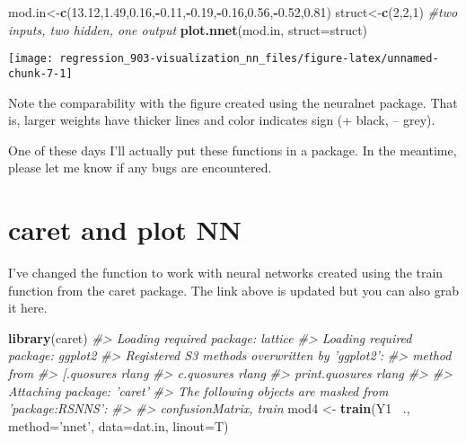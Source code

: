 \documentclass[]{book}
\newenvironment{Shaded}{\begin{snugshade}}{\end{snugshade}}
\newcommand{\CommentTok}[1]{\textcolor[rgb]{0.56,0.35,0.01}{\textit{#1}}}
\newcommand{\DataTypeTok}[1]{\textcolor[rgb]{0.13,0.29,0.53}{#1}}
\newcommand{\DecValTok}[1]{\textcolor[rgb]{0.00,0.00,0.81}{#1}}
\newcommand{\FloatTok}[1]{\textcolor[rgb]{0.00,0.00,0.81}{#1}}
\newcommand{\KeywordTok}[1]{\textcolor[rgb]{0.13,0.29,0.53}{\textbf{#1}}}
\newcommand{\NormalTok}[1]{#1}
\newcommand{\OperatorTok}[1]{\textcolor[rgb]{0.81,0.36,0.00}{\textbf{#1}}}
\newcommand{\StringTok}[1]{\textcolor[rgb]{0.31,0.60,0.02}{#1}}
\begin{document}
\begin{Shaded}
\begin{Highlighting}[]
\NormalTok{mod.in<-}\KeywordTok{c}\NormalTok{(}\FloatTok{13.12}\NormalTok{,}\FloatTok{1.49}\NormalTok{,}\FloatTok{0.16}\NormalTok{,}\OperatorTok{-}\FloatTok{0.11}\NormalTok{,}\OperatorTok{-}\FloatTok{0.19}\NormalTok{,}\OperatorTok{-}\FloatTok{0.16}\NormalTok{,}\FloatTok{0.56}\NormalTok{,}\OperatorTok{-}\FloatTok{0.52}\NormalTok{,}\FloatTok{0.81}\NormalTok{)}
\NormalTok{struct<-}\KeywordTok{c}\NormalTok{(}\DecValTok{2}\NormalTok{,}\DecValTok{2}\NormalTok{,}\DecValTok{1}\NormalTok{) }\CommentTok{#two inputs, two hidden, one output }
\KeywordTok{plot.nnet}\NormalTok{(mod.in, }\DataTypeTok{struct=}\NormalTok{struct)}
\end{Highlighting}
\end{Shaded}

\begin{center}\texttt{[image: regression\_903-visualization\_nn\_files/figure-latex/unnamed-chunk-7-1]} \end{center}

Note the comparability with the figure created using the neuralnet package. That is, larger weights have thicker lines and color indicates sign (+ black, -- grey).

One of these days I'll actually put these functions in a package. In the meantime, please let me know if any bugs are encountered.

\hypertarget{caret-and-plot-nn}{%
\section{caret and plot NN}\label{caret-and-plot-nn}}

I've changed the function to work with neural networks created using the train function from the caret package. The link above is updated but you can also grab it here.

\begin{Shaded}
\begin{Highlighting}[]
\KeywordTok{library}\NormalTok{(caret)}
\CommentTok{#> Loading required package: lattice}
\CommentTok{#> Loading required package: ggplot2}
\CommentTok{#> Registered S3 methods overwritten by 'ggplot2':}
\CommentTok{#>   method         from }
\CommentTok{#>   [.quosures     rlang}
\CommentTok{#>   c.quosures     rlang}
\CommentTok{#>   print.quosures rlang}
\CommentTok{#> }
\CommentTok{#> Attaching package: 'caret'}
\CommentTok{#> The following objects are masked from 'package:RSNNS':}
\CommentTok{#> }
\CommentTok{#>     confusionMatrix, train}
\NormalTok{mod4 <-}\StringTok{ }\KeywordTok{train}\NormalTok{(Y1 }\OperatorTok{~}\NormalTok{., }\DataTypeTok{method=}\StringTok{'nnet'}\NormalTok{, }\DataTypeTok{data=}\NormalTok{dat.in, }\DataTypeTok{linout=}\NormalTok{T)}
\end{Highlighting}
\end{Shaded}
\end{document}
